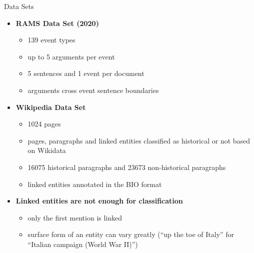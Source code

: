 \documentclass[10pt,aspectratio=1610,professionalfont]{beamer}
\begin{document}
\begin{frame}{Data Sets}
    \begin{itemize}
        \item \textbf{RAMS Data Set (2020)}
        \begin{itemize}
            \item 139 event types
            \item up to 5 arguments per event
            \item 5 sentences and 1 event per document
            \item arguments cross event sentence boundaries 
        \end{itemize}
        
        \item \textbf{Wikipedia Data Set}
        \begin{itemize}
            \item 1024 pages
            \item pages, paragraphs and linked entities classified as historical or not based on Wikidata
            \item 16075 historical paragraphs and 23673 non-historical paragraphs 
            \item linked entities annotated in the BIO format 
        \end{itemize}

        \item \textbf{Linked entities are not enough for classification}
        \begin{itemize}
            \item only the first mention is linked
            \item surface form of an entity can vary greatly (“up the toe of Italy” for “Italian campaign (World War II)”)
        \end{itemize} 
        
    \end{itemize}
\end{frame}
\end{document}
